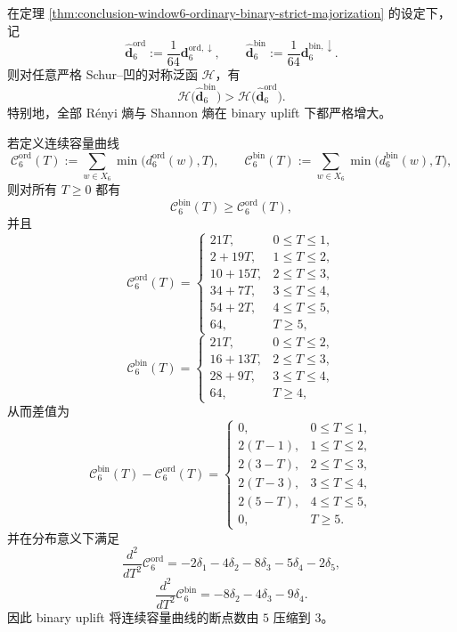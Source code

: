 \begin{corollary}\label{cor:conclusion-window6-majorization-entropy-capacity-order}
在定理 \ref{thm:conclusion-window6-ordinary-binary-strict-majorization} 的设定下，记
\[
\widehat{\mathbf d}_6^{\mathrm{ord}}:=\frac{1}{64}\mathbf d_6^{\mathrm{ord},\downarrow},
\qquad
\widehat{\mathbf d}_6^{\mathrm{bin}}:=\frac{1}{64}\mathbf d_6^{\mathrm{bin},\downarrow}.
\]
则对任意严格 Schur--凹的对称泛函 \(\mathcal H\)，有
\[
\mathcal H\!\bigl(\widehat{\mathbf d}_6^{\mathrm{bin}}\bigr)>
\mathcal H\!\bigl(\widehat{\mathbf d}_6^{\mathrm{ord}}\bigr).
\]
特别地，全部 Rényi 熵与 Shannon 熵在 binary uplift 下都严格增大。

若定义连续容量曲线
\[
\mathcal C_6^{\mathrm{ord}}(T):=\sum_{w\in X_6}\min\bigl(d_6^{\mathrm{ord}}(w),T\bigr),
\qquad
\mathcal C_6^{\mathrm{bin}}(T):=\sum_{w\in X_6}\min\bigl(d_6^{\mathrm{bin}}(w),T\bigr),
\]
则对所有 \(T\ge 0\) 都有
\[
\mathcal C_6^{\mathrm{bin}}(T)\ge \mathcal C_6^{\mathrm{ord}}(T),
\]
并且
\[
\mathcal C_6^{\mathrm{ord}}(T)=
\begin{cases}
21T,& 0\le T\le 1,\\
2+19T,& 1\le T\le 2,\\
10+15T,& 2\le T\le 3,\\
34+7T,& 3\le T\le 4,\\
54+2T,& 4\le T\le 5,\\
64,& T\ge 5,
\end{cases}
\]
\[
\mathcal C_6^{\mathrm{bin}}(T)=
\begin{cases}
21T,& 0\le T\le 2,\\
16+13T,& 2\le T\le 3,\\
28+9T,& 3\le T\le 4,\\
64,& T\ge 4,
\end{cases}
\]
从而差值为
\[
\mathcal C_6^{\mathrm{bin}}(T)-\mathcal C_6^{\mathrm{ord}}(T)=
\begin{cases}
0,& 0\le T\le 1,\\
2(T-1),& 1\le T\le 2,\\
2(3-T),& 2\le T\le 3,\\
2(T-3),& 3\le T\le 4,\\
2(5-T),& 4\le T\le 5,\\
0,& T\ge 5.
\end{cases}
\]
并在分布意义下满足
\[
\frac{d^2}{dT^2}\mathcal C_6^{\mathrm{ord}}
=-2\delta_1-4\delta_2-8\delta_3-5\delta_4-2\delta_5,
\]
\[
\frac{d^2}{dT^2}\mathcal C_6^{\mathrm{bin}}
=-8\delta_2-4\delta_3-9\delta_4.
\]
因此 binary uplift 将连续容量曲线的断点数由 \(5\) 压缩到 \(3\)。
\end{corollary}
